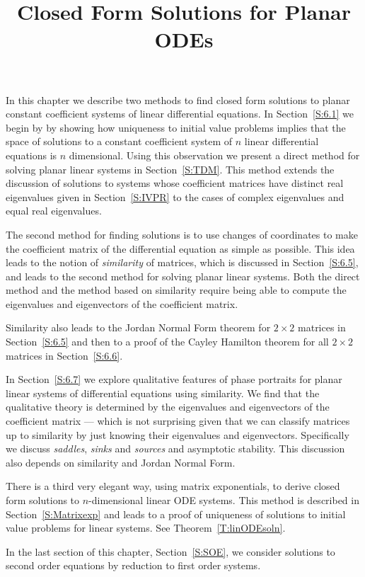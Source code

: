 \documentclass{ximera}
\title{Closed Form Solutions for Planar ODEs}
\begin{document}
\begin{abstract}
\end{abstract}
\maketitle


\label{Chap:Planar}

\normalsize

In this chapter we describe two methods to find closed form
solutions to planar constant coefficient systems of linear differential
equations.  In Section~\ref{S:6.1} we begin by by showing how uniqueness to
initial value problems implies that the space of solutions to a constant
coefficient system of $n$ linear differential equations is $n$ dimensional.
Using this observation we present a direct method for solving planar linear
systems in Section~\ref{S:TDM}.  This method extends the discussion of
solutions to systems whose coefficient matrices have distinct real
eigenvalues given in Section~\ref{S:IVPR} to the cases of complex
eigenvalues and equal real eigenvalues.

The second method for finding solutions is to use changes of coordinates to 
make the coefficient matrix of the differential equation as simple as possible.  
This idea leads to the notion of {\em similarity\/} of matrices, which is discussed 
in Section~\ref{S:6.5}, and leads to the second method for solving planar linear 
systems. Both the direct method and the method based on similarity require 
being able to compute the eigenvalues and eigenvectors of the coefficient matrix.

Similarity also leads to the Jordan Normal Form theorem for 
$2\times 2$ matrices in Section~\ref{S:6.5} and then to a proof of the Cayley 
Hamilton theorem for all $2\times 2$ matrices in Section~\ref{S:6.6}.

In Section~\ref{S:6.7} we explore qualitative features of phase portraits for planar 
linear systems of differential equations using similarity.  We find that the 
qualitative theory is determined by the eigenvalues and 
eigenvectors of the coefficient matrix --- which is not surprising given
that we can classify matrices up to similarity by just knowing their
eigenvalues and eigenvectors.  Specifically we discuss {\em saddles\/},
{\em sinks\/} and {\em sources\/} and asymptotic stability.  This discussion also 
depends on similarity and Jordan Normal Form.

There is a third very elegant way, using matrix exponentials, to derive closed 
form solutions to $n$-dimensional linear ODE systems.  This method is described 
in Section~\ref{S:Matrixexp} and leads to a proof of uniqueness of solutions to initial value 
problems for linear systems.  See Theorem~\ref{T:linODEsoln}. 


In the last section of this chapter, Section~\ref{S:SOE}, we consider
solutions to second order equations by reduction to first order systems.
\end{document}
